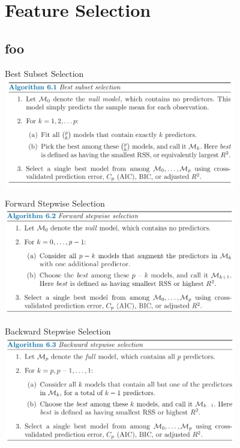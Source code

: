 \documentclass[serif,xcolor=pdftex,dvipsnames,table,hyperref={bookmarks=false,breaklinks}]{beamer}
\begin{document}
\section{Feature Selection}
\subsection{foo}

\begin{frame}[t]{Best Subset Selection}
\center
\includegraphics[width=4in]{../Figures/best_subset_selection.png}

\end{frame}

\begin{frame}[t]{Forward Stepwise Selection}
\center
\includegraphics[width=4in]{../Figures/forward_selection.png}
\end{frame}

\begin{frame}[t]{Backward Stepwise Selection}
\center
\includegraphics[width=4in]{../Figures/backward_selection.png}
\end{frame}
\end{document}
